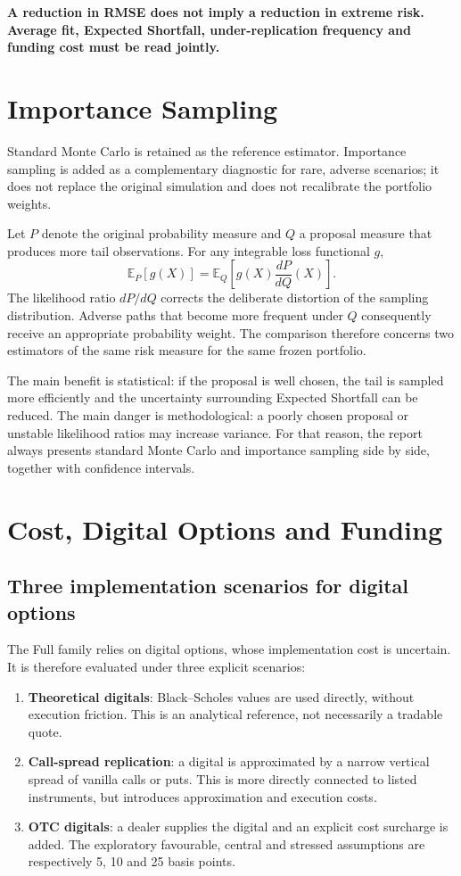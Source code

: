 \documentclass[11pt,a4paper]{article}
\newcommand{\important}[1]{\par\noindent\colorbox{pale}{\parbox{0.96\linewidth}{\color{navy}\textbf{#1}}}\par}
\begin{document}
\important{A reduction in RMSE does not imply a reduction in extreme risk. Average fit, Expected Shortfall, under-replication frequency and funding cost must be read jointly.}

\section{Importance Sampling}

Standard Monte Carlo is retained as the reference estimator. Importance sampling is added as a complementary diagnostic for rare, adverse scenarios; it does not replace the original simulation and does not recalibrate the portfolio weights.

Let $P$ denote the original probability measure and $Q$ a proposal measure that produces more tail observations. For any integrable loss functional $g$,
\[
\mathbb{E}_{P}[g(X)]
=
\mathbb{E}_{Q}\!\left[g(X)\frac{dP}{dQ}(X)\right].
\]
The likelihood ratio $dP/dQ$ corrects the deliberate distortion of the sampling distribution. Adverse paths that become more frequent under $Q$ consequently receive an appropriate probability weight. The comparison therefore concerns two estimators of the same risk measure for the same frozen portfolio.

The main benefit is statistical: if the proposal is well chosen, the tail is sampled more efficiently and the uncertainty surrounding Expected Shortfall can be reduced. The main danger is methodological: a poorly chosen proposal or unstable likelihood ratios may increase variance. For that reason, the report always presents standard Monte Carlo and importance sampling side by side, together with confidence intervals.

\section{Cost, Digital Options and Funding}

\subsection{Three implementation scenarios for digital options}

The Full family relies on digital options, whose implementation cost is uncertain. It is therefore evaluated under three explicit scenarios:

\begin{enumerate}
\item \textbf{Theoretical digitals}: Black--Scholes values are used directly, without execution friction. This is an analytical reference, not necessarily a tradable quote.
\item \textbf{Call-spread replication}: a digital is approximated by a narrow vertical spread of vanilla calls or puts. This is more directly connected to listed instruments, but introduces approximation and execution costs.
\item \textbf{OTC digitals}: a dealer supplies the digital and an explicit cost surcharge is added. The exploratory favourable, central and stressed assumptions are respectively 5, 10 and 25 basis points.
\end{enumerate}
\end{document}
